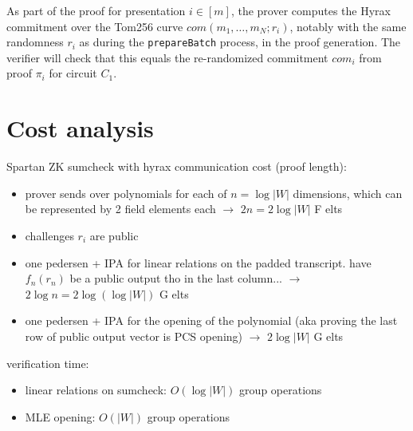 As part of the proof for presentation $i \in [m]$, the prover computes the Hyrax commitment over the Tom256 curve $com(m_1, \dots, m_N; r_i)$, 
notably with the same randomness $r_i$ as during the \texttt{prepareBatch} process, in the proof generation. 
The verifier will check that this equals the re-randomized commitment $com_i$ from proof $\pi_i$ for circuit $C_1$. 

\section{Cost analysis}

Spartan ZK sumcheck with hyrax communication cost (proof length):
\begin{itemize}
    \item prover sends over polynomials for each of $n = \log|W|$ dimensions, which can be represented by 2 field elements each $\longrightarrow$ $2n = 2 \log|W|$ F elts
    \item challenges $r_i$ are public
    \item one pedersen + IPA for linear relations on the padded transcript. have $f_n(r_n)$ be a public output tho in the last column... $\longrightarrow$ $2 \log n = 2 \log (\log|W|)$ G elts
    \item one pedersen + IPA for the opening of the polynomial (aka proving the last row of public output vector is PCS opening) $\longrightarrow$ $2 \log |W|$ G elts
\end{itemize}

verification time:
\begin{itemize}
    \item linear relations on sumcheck: $O(\log|W|)$ group operations
    \item MLE opening: $O(|W|)$ group operations 
\end{itemize}

